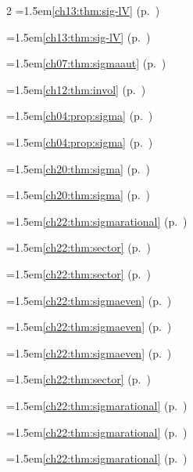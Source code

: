\begin{multicols}{2}
\hangindent=1.5em\quad \ref{ch13:thm:sig-lV} (p.~\pageref{ch13:thm:sig-lV})\par
\hangindent=1.5em\quad \ref{ch13:thm:sig-lV} (p.~\pageref{ch13:thm:sig-lV})\par
\hangindent=1.5em\quad \ref{ch07:thm:sigmaaut} (p.~\pageref{ch07:thm:sigmaaut})\par
\hangindent=1.5em\quad \ref{ch12:thm:invol} (p.~\pageref{ch12:thm:invol})\par
\hangindent=1.5em\quad \ref{ch04:prop:sigma} (p.~\pageref{ch04:prop:sigma})\par
\hangindent=1.5em\quad \ref{ch04:prop:sigma} (p.~\pageref{ch04:prop:sigma})\par
\hangindent=1.5em\quad \ref{ch20:thm:sigma} (p.~\pageref{ch20:thm:sigma})\par
\hangindent=1.5em\quad \ref{ch20:thm:sigma} (p.~\pageref{ch20:thm:sigma})\par
\hangindent=1.5em\quad \ref{ch22:thm:sigmarational} (p.~\pageref{ch22:thm:sigmarational})\par
\hangindent=1.5em\quad \ref{ch22:thm:sector} (p.~\pageref{ch22:thm:sector})\par
\hangindent=1.5em\quad \ref{ch22:thm:sector} (p.~\pageref{ch22:thm:sector})\par
\hangindent=1.5em\quad \ref{ch22:thm:sigmaeven} (p.~\pageref{ch22:thm:sigmaeven})\par
\hangindent=1.5em\quad \ref{ch22:thm:sigmaeven} (p.~\pageref{ch22:thm:sigmaeven})\par
\hangindent=1.5em\quad \ref{ch22:thm:sigmaeven} (p.~\pageref{ch22:thm:sigmaeven})\par
\hangindent=1.5em\quad \ref{ch22:thm:sector} (p.~\pageref{ch22:thm:sector})\par
\hangindent=1.5em\quad \ref{ch22:thm:sigmarational} (p.~\pageref{ch22:thm:sigmarational})\par
\hangindent=1.5em\quad \ref{ch22:thm:sigmarational} (p.~\pageref{ch22:thm:sigmarational})\par
\hangindent=1.5em\quad \ref{ch22:thm:sigmarational} (p.~\pageref{ch22:thm:sigmarational})\par

\end{multicols}
